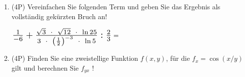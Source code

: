 \begin{enumerate}[label=(\alph*)]

	\item (4P) Vereinfachen Sie folgenden Term und geben Sie das Ergebnis als vollständig gekürzten Bruch an!
	
	$\Scale[1.35] { \frac{1}{-6} + \frac{\sqrt{3} \enspace \cdot \enspace \sqrt{12} \enspace \cdot \enspace \ln 25}{3 \enspace \cdot \enspace \left(\frac{1}{2}\right)^{-3} \enspace \cdot \enspace \ln 5} : \frac{2}{3}  } = $
		\bigskip
		\bigskip
		\bigskip
		\bigskip
		\bigskip
		\bigskip
		\bigskip
		\bigskip
		\bigskip
		\bigskip
		\bigskip
		\bigskip
		\bigskip
		\bigskip
		\bigskip
		\bigskip
		\bigskip
		
	\item (4P) Finden Sie eine zweistellige Funktion $f(x,y)$, für die $f_x = \cos(x/y)$ gilt und berechnen Sie $f_{yx}$ !

\end{enumerate}
